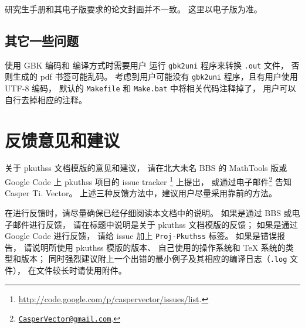 		研究生手册和其电子版\supercite{pku-thesisstyle}要求的论文封面并不一致。
		这里以电子版为准。

		\subsection{其它一些问题}

		使用 GBK 编码和  编译方式时需要用户%
		运行 \verb|gbk2uni| 程序来转换 \verb|.out| 文件，
		否则生成的 pdf 书签可能乱码。
		考虑到用户可能没有 \verb|gbk2uni| 程序，且有用户使用 UTF-8 编码，
		默认的 \verb|Makefile| 和 \verb|Make.bat| 中将相关代码注释掉了，
		用户可以自行去掉相应的注释。

	\section{反馈意见和建议}

	关于 pkuthss 文档模版的意见和建议，
	请在北大未名 BBS 的 MathTools 版或 %
	Google Code 上 pkuthss 项目的 issue tracker%
	\footnote{\url{http://code.google.com/p/caspervector/issues/list}.}%
	上提出，
	或通过电子邮件\footnote%
	{\href{mailto:CasperVector@gmail.com}{\texttt{CasperVector@gmail.com}}.}%
	告知 Casper Ti. Vector。
	上述三种反馈方法中，建议用户尽量采用靠前的方法。

	在进行反馈时，请尽量确保已经仔细阅读本文档中的说明。
	如果是通过 BBS 或电子邮件进行反馈，
	请在标题中说明是关于 pkuthss 文档模版的反馈；
	如果是通过 Google Code 进行反馈，
	请给 issue 加上 \verb|Proj-Pkuthss| 标签。
	如果是错误报告，
	请说明所使用 pkuthss 模版的版本、
	自己使用的操作系统和 \TeX{} 系统的类型和版本；
	同时强烈建议附上一个出错的最小例子及其相应的编译日志（\verb|.log| 文件），
	在文件较长时请使用附件。

